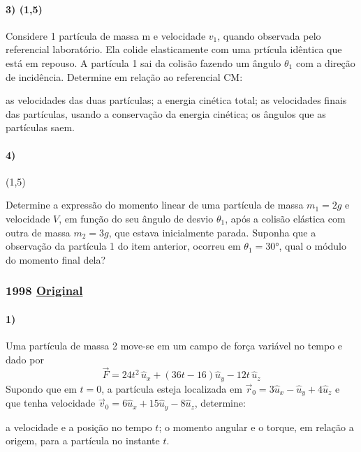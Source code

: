 \documentclass[12pt,a4paper]{article}
\newcommand{\original}[1]{\tiny \href{#1}{Original} \normalsize}
\begin{document}
\paragraph{3) (1,5)} Considere 1 partícula de massa m e velocidade $v_1$, quando observada pelo referencial laboratório. Ela colide elasticamente com uma prtícula idêntica que está em repouso. A partícula 1 sai da colisão fazendo um ângulo $\theta _1$ com a direção de incidência. Determine em relação ao referencial CM:
\begin{tasks}
\task as velocidades das duas partículas;
\task a energia cinética total;
\task as velocidades finais das partículas, usando a conservação da energia cinética;
\task os ângulos que as partículas saem.
\end{tasks}

\paragraph{4)} (1,5)\\
\begin{tasks}
\task Determine a expressão do momento linear de uma partícula de massa $m_1 = 2g$ e velocidade $V$, em função do seu ângulo de desvio $\theta _1$, após a colisão elástica com outra de massa $m_2 = 3g$, que estava inicialmente parada.
\task Suponha que a observação da partícula 1 do item anterior, ocorreu em $\theta _1 = 30$°, qual o módulo do momento final dela?
\end{tasks}

\newpage
\subsubsection{1998 \original{https://drive.google.com/open?id=1d8g4f80ocnCaqNcMROtdYcwdZtZz8GYj}}

\paragraph{1)} Uma partícula de massa 2 move-se em um campo de força variável no tempo e dado por $$\overrightarrow{F} = 24t^2 \,\hat{u}_x + (36t-16)\hat{u}_y - 12t \,\hat{u} _z$$ Supondo que em $t = 0$, a partícula esteja localizada em $\vec{r}_0 = 3 \hat{u}_x - \hat{u}_y + 4\hat{u}_z$ e que tenha velocidade $\vec{v}_0 = 6\hat{u}_x + 15\hat{u}_y - 8\hat{u}_z$, determine:
\begin{tasks}
\task a velocidade e a posição no tempo $t$;
\task o momento angular e o torque, em relação a origem, para a partícula no instante $t$.
\end{tasks}
\end{document}
